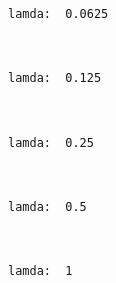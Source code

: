 \documentclass[11pt]{article}
\begin{document}
    \begin{Verbatim}[commandchars=\\\{\}]
lamda:  0.0625

    \end{Verbatim}

    \begin{center}
    \end{center}
    { \hspace*{\fill} \\}
    
    \begin{Verbatim}[commandchars=\\\{\}]
lamda:  0.125

    \end{Verbatim}

    \begin{center}
    \end{center}
    { \hspace*{\fill} \\}
    
    \begin{Verbatim}[commandchars=\\\{\}]
lamda:  0.25

    \end{Verbatim}

    \begin{center}
    \end{center}
    { \hspace*{\fill} \\}
    
    \begin{Verbatim}[commandchars=\\\{\}]
lamda:  0.5

    \end{Verbatim}

    \begin{center}
    \end{center}
    { \hspace*{\fill} \\}
    
    \begin{Verbatim}[commandchars=\\\{\}]
lamda:  1

    \end{Verbatim}
\end{document}
